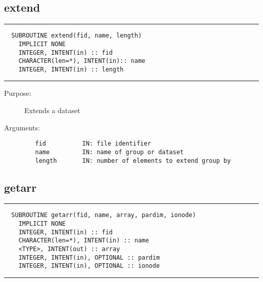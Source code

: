 \documentclass[a4paper]{article}
\begin{document}
\subsection{extend}

\par
\addvspace{\medskipamount}
\nopagebreak\hrule
\begin{verbatim}
  SUBROUTINE extend(fid, name, length)
    IMPLICIT NONE
    INTEGER, INTENT(in) :: fid
    CHARACTER(len=*), INTENT(in):: name
    INTEGER, INTENT(in) :: length
\end{verbatim}
\nopagebreak\hrule
\addvspace{\medskipamount}

\begin{description}
\item[Purpose:] \mbox{}

Extends a dataset

\item[Arguments:] \mbox{}

\begin{verbatim}
   fid          IN: file identifier
   name         IN: name of group or dataset
   length       IN: number of elements to extend group by

\end{verbatim}


\end{description}





\subsection{getarr}

\par
\addvspace{\medskipamount}
\nopagebreak\hrule
\begin{verbatim}
  SUBROUTINE getarr(fid, name, array, pardim, ionode)
    IMPLICIT NONE
    INTEGER, INTENT(in) :: fid
    CHARACTER(len=*), INTENT(in) :: name
    <TYPE>, INTENT(out) :: array
    INTEGER, INTENT(in), OPTIONAL :: pardim
    INTEGER, INTENT(in), OPTIONAL :: ionode
\end{verbatim}
\nopagebreak\hrule
\addvspace{\medskipamount}
\end{document}
